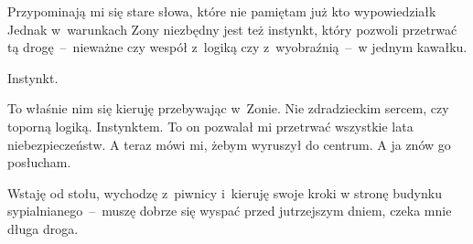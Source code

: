 \documentclass[../MAIN.tex]{subfiles}
\begin{document}
Przypominają mi się stare słowa, które nie pamiętam już kto
wypowiedział\3k Jednak w~warunkach Zony niezbędny jest też
instynkt, który pozwoli przetrwać tą drogę~--~nieważne czy
wespół z~logiką czy z~wyobraźnią~--~w jednym kawałku.

Instynkt.

To właśnie nim się kieruję przebywając w~Zonie. Nie
zdradzieckim sercem, czy toporną logiką. Instynktem. To on
pozwalał mi przetrwać wszystkie lata niebezpieczeństw. A teraz
mówi mi, żebym wyruszył do centrum. A ja znów go posłucham.

Wstaję od stołu, wychodzę z~piwnicy i~kieruję swoje kroki w
stronę budynku sypialnianego~--~muszę dobrze się wyspać przed
jutrzejszym dniem, czeka mnie długa droga.
\end{document}
